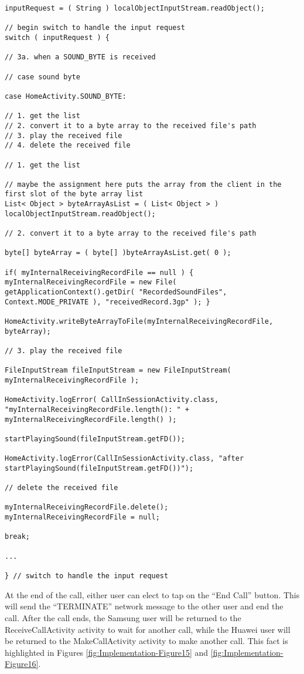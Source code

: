 \documentclass[12pt,svgnames,smaller]{article} %
\begin{document}
		\begin{verbatim}
inputRequest = ( String ) localObjectInputStream.readObject();

// begin switch to handle the input request
switch ( inputRequest ) {

// 3a. when a SOUND_BYTE is received

// case sound byte

case HomeActivity.SOUND_BYTE:

// 1. get the list
// 2. convert it to a byte array to the received file's path
// 3. play the received file
// 4. delete the received file

// 1. get the list

// maybe the assignment here puts the array from the client in the first slot of the byte array list
List< Object > byteArrayAsList = ( List< Object > ) localObjectInputStream.readObject();

// 2. convert it to a byte array to the received file's path

byte[] byteArray = ( byte[] )byteArrayAsList.get( 0 );

if( myInternalReceivingRecordFile == null ) { myInternalReceivingRecordFile = new File( getApplicationContext().getDir( "RecordedSoundFiles", Context.MODE_PRIVATE ), "receivedRecord.3gp" ); }

HomeActivity.writeByteArrayToFile(myInternalReceivingRecordFile, byteArray);

// 3. play the received file

FileInputStream fileInputStream = new FileInputStream( myInternalReceivingRecordFile );

HomeActivity.logError( CallInSessionActivity.class, "myInternalReceivingRecordFile.length(): " + myInternalReceivingRecordFile.length() );

startPlayingSound(fileInputStream.getFD());

HomeActivity.logError(CallInSessionActivity.class, "after startPlayingSound(fileInputStream.getFD())");

// delete the received file

myInternalReceivingRecordFile.delete();
myInternalReceivingRecordFile = null;

break;							

...

} // switch to handle the input request                
		\end{verbatim}
		
		At the end of the call, either user can elect to tap on the “End Call” button. This will send the “TERMINATE” network message to the other user and end the call. After the call ends, the Samsung user will be returned to the ReceiveCallActivity activity to wait for another call, while the Huawei user will be returned to the MakeCallActivity activity to make another call. This fact is highlighted in Figures \ref{fig:Implementation-Figure15} and \ref{fig:Implementation-Figure16}.
		
\end{document}
